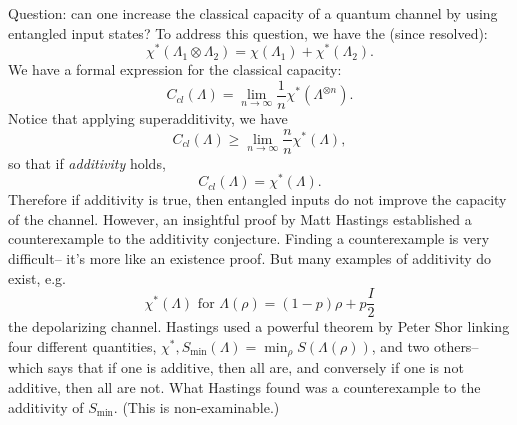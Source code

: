Question: can one increase the classical capacity of a quantum channel by using entangled input states? To address this question, we have the  (since resolved):
\begin{equation}
    \chi^*(\Lambda_1 \otimes \Lambda_2)=\chi(\Lambda_1) +\chi^*(\Lambda_2).
\end{equation}
We have a formal expression for the classical capacity:
\begin{equation}
    C_{cl}(\Lambda)=\lim_{n\to \infty} \frac{1}{n} \chi^*(\Lambda^{\otimes n}).
\end{equation}
Notice that applying superadditivity, we have
\begin{equation}
    C_{cl}(\Lambda) \geq \lim_{n\to \infty}\frac{n}{n} \chi^*(\Lambda),
\end{equation}
so that if \emph{additivity} holds,
\begin{equation}
    C_{cl}(\Lambda)=\chi^*(\Lambda).
\end{equation}
Therefore if additivity is true, then entangled inputs do not improve the capacity of the channel. However, an insightful proof by Matt Hastings established a counterexample to the additivity conjecture. Finding a counterexample is very difficult-- it's more like an existence proof. But many examples of additivity do exist, e.g.
\begin{equation}
    \chi^*(\Lambda) \text{ for }\Lambda(\rho)=(1-p) \rho+p\frac{I}{2}
\end{equation}
the depolarizing channel. Hastings used a powerful theorem by Peter Shor linking four different quantities, $\chi^*, S_{\min}(\Lambda)=\min_\rho S(\Lambda(\rho))$, and two others-- which says that if one is additive, then all are, and conversely if one is not additive, then all are not. What Hastings found was a counterexample to the additivity of $S_{\min}$. (This is non-examinable.)

